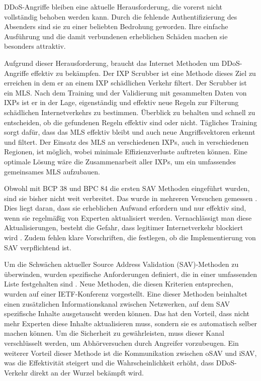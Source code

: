 \documentclass[sigplan,screen]{acmart}
\begin{document}
DDoS-Angriffe bleiben eine aktuelle Herausforderung, die vorerst nicht vollständig behoben werden kann. Durch die fehlende Authentifizierung des Absenders sind sie zu einer beliebten Bedrohung geworden. Ihre einfache Ausführung und die damit verbundenen erheblichen Schäden machen sie besonders attraktiv.

Aufgrund dieser Herausforderung, braucht das Internet Methoden um DDoS-Angriffe effektiv zu bekämpfen. Der IXP Scrubber \cite{Hohlfeld01} ist eine Methode dieses Ziel zu erreichen in dem er an einem IXP schädlichen Verkehr filtert. Der Scrubber ist ein MLS. Nach dem Training und der Validierung mit gesammelten Daten von IXPs ist er in der Lage, eigenständig und effektiv neue Regeln zur Filterung schädlichen Internetverkehrs zu bestimmen. Überblick zu behalten und schnell zu entscheiden, ob die gefundenen Regeln effektiv sind oder nicht. Tägliches Training sorgt dafür, dass das MLS effektiv bleibt und auch neue Angriffsvektoren erkennt und filtert. Der Einsatz des MLS an verschiedenen IXPs, auch in verschiedenen Regionen, ist möglich, wobei minimale Effizienzverluste auftreten können. Eine optimale Lösung wäre die Zusammenarbeit aller IXPs, um ein umfassendes gemeinsames MLS aufzubauen.

Obwohl mit BCP 38 und BPC 84 die ersten SAV Methoden eingeführt wurden, sind sie bisher nicht weit verbreitet. Das wurde in mehreren Versuchen gemessen \cite{Spoofer01} \cite{CRP01} \cite{largemeasurment01}. Dies liegt daran, dass sie erheblichen Aufwand erfordern und nur effektiv sind, wenn sie regelmäßig von Experten aktualisiert werden. Vernachlässigt man diese Aktualisierungen, besteht die Gefahr, dass legitimer Internetverkehr blockiert wird \cite{SAV_requirements01}. Zudem fehlen klare Vorschriften, die festlegen, ob die Implementierung von SAV verpflichtend ist.

Um die Schwächen aktueller Source Address Validation (SAV)-Methoden zu überwinden, wurden spezifische Anforderungen definiert, die in einer umfassenden Liste festgehalten sind \cite{SAV_requirements01}. Neue Methoden, die diesen Kriterien entsprechen, wurden auf einer IETF-Konferenz vorgestellt. Eine dieser Methoden beinhaltet einen zusätzlichen Informationskanal zwischen Netzwerken, auf dem SAV spezifische Inhalte ausgetauscht werden können. Das hat den Vorteil, dass nicht mehr Experten diese Inhalte aktualisieren muss, sondern sie es automatisch selber machen können. Um die Sicherheit zu gewährleisten, muss dieser Kanal verschlüsselt werden, um Abhörversuchen durch Angreifer vorzubeugen. Ein weiterer Vorteil dieser Methode ist die Kommunikation zwischen oSAV und iSAV, was die Effektivität steigert und die Wahrscheinlichkeit erhöht, dass DDoS-Verkehr direkt an der Wurzel bekämpft wird.
\end{document}
